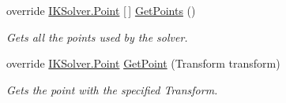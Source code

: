 \begin{DoxyCompactItemize}
override \mbox{\hyperlink{class_root_motion_1_1_final_i_k_1_1_i_k_solver_1_1_point}{I\+K\+Solver.\+Point}} \mbox{[}$\,$\mbox{]} \mbox{\hyperlink{class_root_motion_1_1_final_i_k_1_1_i_k_solver_heuristic_a1b250288b7b2b165e6e7f30048410f05}{Get\+Points}} ()
\begin{DoxyCompactList}\small\item\em Gets all the points used by the solver. \end{DoxyCompactList}\item 
override \mbox{\hyperlink{class_root_motion_1_1_final_i_k_1_1_i_k_solver_1_1_point}{I\+K\+Solver.\+Point}} \mbox{\hyperlink{class_root_motion_1_1_final_i_k_1_1_i_k_solver_heuristic_a6f6fe66f3e434877da9d23e492448fda}{Get\+Point}} (Transform transform)
\begin{DoxyCompactList}\small\item\em Gets the point with the specified Transform. \end{DoxyCompactList}\end{DoxyCompactItemize}
